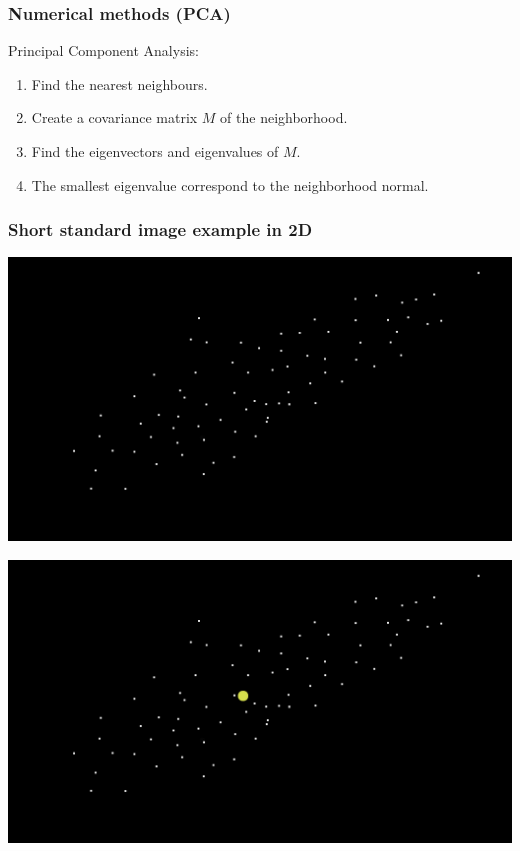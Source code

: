 \documentclass[11pt]{article}
\begin{document}
\subsubsection*{Numerical methods (PCA)}
\label{sec:org7c40953}
Principal Component Analysis:
\begin{enumerate}
\item Find the nearest neighbours.
\item Create a covariance matrix \(M\) of the neighborhood.
\item Find the eigenvectors and eigenvalues of \(M\).
\item The smallest eigenvalue correspond to the neighborhood normal.
\end{enumerate}

\subsubsection*{Short standard image example in 2D}
\label{sec:orgab715d7}
\begin{center}
\includegraphics[width=.9\linewidth]{./images/pca_expl_img_points.png}
\end{center}

\begin{center}
\includegraphics[width=.9\linewidth]{./images/pca_expl_img_points_mean.png}
\end{center}
\end{document}
